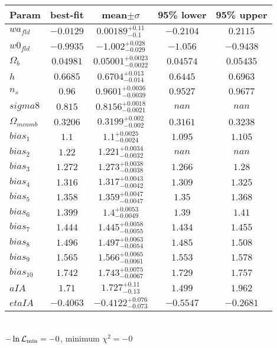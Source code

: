 \begin{tabular}{|l|c|c|c|c|} 
 \hline 
Param & best-fit & mean$\pm\sigma$ & 95\% lower & 95\% upper \\ \hline 
$wa_{fld }$ &$-0.0129$ & $0.00189_{-0.1}^{+0.11}$ & $-0.2104$ & $0.2115$ \\ 
$w0_{fld }$ &$-0.9935$ & $-1.002_{-0.029}^{+0.028}$ & $-1.056$ & $-0.9438$ \\ 
$\Omega{}_{b }$ &$0.04981$ & $0.05001_{-0.0022}^{+0.0023}$ & $0.04574$ & $0.05435$ \\ 
$h$ &$0.6685$ & $0.6704_{-0.014}^{+0.013}$ & $0.6445$ & $0.6963$ \\ 
$n_{s }$ &$0.96$ & $0.9601_{-0.0039}^{+0.0036}$ & $0.9527$ & $0.9677$ \\ 
$sigma8$ &$0.815$ & $0.8156_{-0.0021}^{+0.0018}$ & $nan$ & $nan$ \\ 
$\Omega{}_{m camb }$ &$0.3206$ & $0.3199_{-0.002}^{+0.002}$ & $0.3161$ & $0.3238$ \\ 
$bias_{1 }$ &$1.1$ & $1.1_{-0.0024}^{+0.0025}$ & $1.095$ & $1.105$ \\ 
$bias_{2 }$ &$1.22$ & $1.221_{-0.0032}^{+0.0034}$ & $nan$ & $nan$ \\ 
$bias_{3 }$ &$1.272$ & $1.273_{-0.0038}^{+0.0038}$ & $1.266$ & $1.28$ \\ 
$bias_{4 }$ &$1.316$ & $1.317_{-0.0042}^{+0.0043}$ & $1.309$ & $1.325$ \\ 
$bias_{5 }$ &$1.358$ & $1.359_{-0.0047}^{+0.0047}$ & $1.35$ & $1.368$ \\ 
$bias_{6 }$ &$1.399$ & $1.4_{-0.0049}^{+0.0053}$ & $1.39$ & $1.41$ \\ 
$bias_{7 }$ &$1.444$ & $1.445_{-0.0055}^{+0.0058}$ & $1.434$ & $1.455$ \\ 
$bias_{8 }$ &$1.496$ & $1.497_{-0.0054}^{+0.0063}$ & $1.485$ & $1.508$ \\ 
$bias_{9 }$ &$1.565$ & $1.566_{-0.0061}^{+0.0065}$ & $1.553$ & $1.578$ \\ 
$bias_{10 }$ &$1.742$ & $1.743_{-0.0067}^{+0.0075}$ & $1.729$ & $1.757$ \\ 
$aIA$ &$1.71$ & $1.727_{-0.13}^{+0.11}$ & $1.499$ & $1.962$ \\ 
$etaIA$ &$-0.4063$ & $-0.4122_{-0.073}^{+0.076}$ & $-0.5547$ & $-0.2681$ \\ 
\hline 
 \end{tabular} \\ 
$-\ln{\cal L}_\mathrm{min} =-0$, minimum $\chi^2=-0$ \\ 
